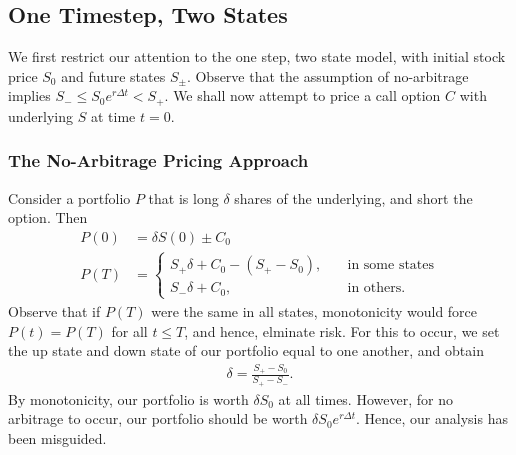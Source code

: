 \documentclass[12pt]{article}
\theoremstyle{plain}
\theoremstyle{definition}
\theoremstyle{remark}
\numberwithin{equation}{section}  %
\begin{document}
\subsection{One Timestep, Two States}
We first restrict our attention to the one step, two state model, with
initial stock price $S_{0}$ and future states $S_{\pm}$. Observe that
the assumption of no-arbitrage implies $S_{-} \le S_{0}e^{r \Delta t} < S_{+}$.
We shall now attempt to price a call option $C$ with underlying $S$ at time
$t=0$. 

\subsubsection{The No-Arbitrage Pricing Approach}
Consider a portfolio $P$ that is long $\delta$
shares of the underlying, and short the option. Then
\begin{equation*}
	\begin{split}
	P(0)  & = \delta S(0) \pm C_{0} 
		\\
		 P(T)  & = \begin{cases}
			 S_{+} \delta + C_{0} - (S_{+} - S_{0}), \quad & \text{in some states}
		\\
		S_{-} \delta + C_{0}, \quad & \text{in others}.
		\end{cases}
	\end{split}
	\end{equation*}
	Observe that if $P(T)$ were the same in all states, monotonicity would force
	$P(t) = P(T)$ for all $t \le T$, and hence, elminate risk. For this to occur,
	we set the up state and down state of our portfolio equal to one another, and
	obtain 
	\begin{equation}\label{risk-free-delta}
		\begin{split}
			\delta = \frac{S_{+} - S_{0}}{S_{+} - S_{-}}.	
		\end{split}
	\end{equation}
	By monotonicity, our portfolio is worth $\delta S_{0}$ at all times. 
	However, for no arbitrage to occur, our portfolio should be worth
	$\delta S_{0} e^{r \Delta t}$. Hence, our analysis has been misguided.
\end{document}
